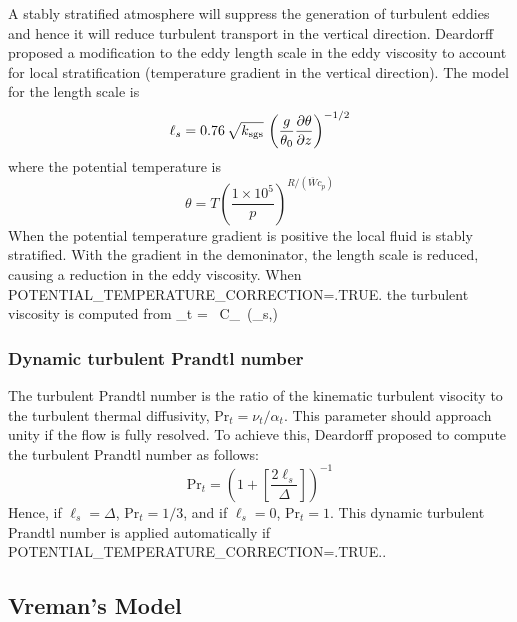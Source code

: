A stably stratified atmosphere will suppress the generation of turbulent eddies and hence it will reduce turbulent transport in the vertical direction.  Deardorff \cite{Deardorff:1980} proposed a modification to the eddy length scale in the eddy viscosity to account for local stratification (temperature gradient in the vertical direction).  The model for the length scale is
\begin{equation}
\label{eq:eddy_length_stability_correction}
\ell_s = 0.76 \, \sqrt{ k_{\rm sgs} } \, \left(\frac{g}{\theta_0} \frac{\partial \theta}{\partial z}\right)^{-1/2}
\end{equation}
where the potential temperature is \cite{Stull:2000}
\begin{equation}
\label{eq:potential_tmp}
\theta = T \left(\frac{1\times 10^5}{p}\right)^{R/(\overline{W}c_p)}
\end{equation}
When the potential temperature gradient is positive the local fluid is stably stratified.  With the gradient in the demoninator, the length scale is reduced, causing a reduction in the eddy viscosity.  When {\ct POTENTIAL\_TEMPERATURE\_CORRECTION=.TRUE.} the turbulent viscosity is computed from
\be
  \label{eq:mut_theta_cor}
  \mu_{\rm t} = \rho \, C_\nu \, \min(\ell_s,\Delta) \, 
\ee

\subsubsection*{Dynamic turbulent Prandtl number}
\label{sec:dyn_turb_Pr}

The turbulent Prandtl number is the ratio of the kinematic turbulent visocity to the turbulent thermal diffusivity, $\mbox{Pr}_t = \nu_t/\alpha_t$.  This parameter should approach unity if the flow is fully resolved.  To achieve this, Deardorff \cite{Deardorff:1980} proposed to compute the turbulent Prandtl number as follows:
\begin{equation}
\mbox{Pr}_t = \left(1 + \left[ \frac{2 \ell_s}{\Delta}\right]\right)^{-1}
\end{equation}
Hence, if $\ell_s = \Delta$, $\mbox{Pr}_t = 1/3$, and if $\ell_s = 0$, $\mbox{Pr}_t = 1$.  This dynamic turbulent Prandtl number is applied automatically if {\ct POTENTIAL\_TEMPERATURE\_CORRECTION=.TRUE.}.

\subsection{Vreman's Model}
\label{sec:vreman}

